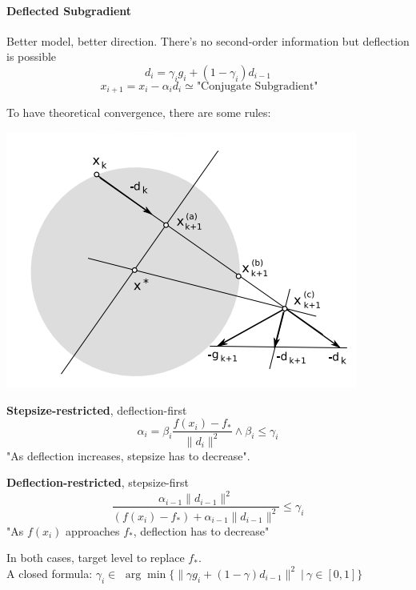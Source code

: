 \documentclass[10pt]{report}
\begin{document}
\paragraph{Deflected Subgradient} Better model, better direction. There's no second-order information but deflection is possible $$d_i = \gamma_ig_i+(1-\gamma_i)d_{i-1}$$ $$\:x_{i+1}=x_i-\alpha_id_i\simeq \text{"Conjugate Subgradient"}$$
\pagebreak

To have theoretical convergence, there are some rules:
\begin{multicols}{2}
\begin{center}
	\includegraphics[scale=0.66]{8.png}
\end{center}
\columnbreak
\begin{list}{}{}
	\item \textbf{Stepsize-restricted}, deflection-first\\
	$$\alpha_i = \beta_i\frac{f(x_i)-f_*}{\|d_i\|^2}\wedge\beta_i\leq\gamma_i$$
	"As deflection increases, stepsize has to decrease".
	\item \textbf{Deflection-restricted}, stepsize-first\\
	$$\frac{\alpha_{i-1}\|d_{i-1}\|^2}{(f(x_i)-f_*)+\alpha_{i-1}\|d_{i-1}\|^2}\leq \gamma_i$$
	"As $f(x_i)$ approaches $f_*$, deflection has to decrease"
\end{list}
\end{multicols}
In both cases, target level to replace $f_*$.\\
A closed formula: $\gamma_i\in$ $\arg\min\{\|\gamma g_i+(1-\gamma)d_{i-1}\|^2\:|\:\gamma\in[0,1]\}$
\end{document}
